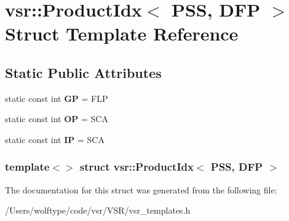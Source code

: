 \hypertarget{structvsr_1_1_product_idx_3_01_p_s_s_00_01_d_f_p_01_4}{\section{vsr\-:\-:Product\-Idx$<$ P\-S\-S, D\-F\-P $>$ Struct Template Reference}
\label{structvsr_1_1_product_idx_3_01_p_s_s_00_01_d_f_p_01_4}
}
\subsection*{Static Public Attributes}
\begin{DoxyCompactItemize}
\item 
\hypertarget{structvsr_1_1_product_idx_3_01_p_s_s_00_01_d_f_p_01_4_ad709d4590c98380b40bf6b473f68d973}{static const int {\bfseries G\-P} = F\-L\-P}\label{structvsr_1_1_product_idx_3_01_p_s_s_00_01_d_f_p_01_4_ad709d4590c98380b40bf6b473f68d973}

\item 
\hypertarget{structvsr_1_1_product_idx_3_01_p_s_s_00_01_d_f_p_01_4_afbff301475d4128ee45e12e2d2de214f}{static const int {\bfseries O\-P} = S\-C\-A}\label{structvsr_1_1_product_idx_3_01_p_s_s_00_01_d_f_p_01_4_afbff301475d4128ee45e12e2d2de214f}

\item 
\hypertarget{structvsr_1_1_product_idx_3_01_p_s_s_00_01_d_f_p_01_4_a8947a95b87d297730689577ff12cd229}{static const int {\bfseries I\-P} = S\-C\-A}\label{structvsr_1_1_product_idx_3_01_p_s_s_00_01_d_f_p_01_4_a8947a95b87d297730689577ff12cd229}

\end{DoxyCompactItemize}
\subsubsection*{template$<$$>$ struct vsr\-::\-Product\-Idx$<$ P\-S\-S, D\-F\-P $>$}



The documentation for this struct was generated from the following file\-:\begin{DoxyCompactItemize}
\item 
/\-Users/wolftype/code/vsr/\-V\-S\-R/vsr\-\_\-templates.\-h\end{DoxyCompactItemize}
